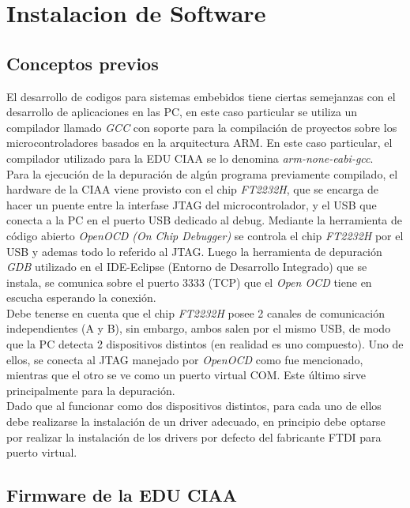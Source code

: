\documentclass[12pt,letterpaper]{article}
\begin{document}
\section{Instalacion de Software}

\subsection{Conceptos previos}
El desarrollo de codigos para sistemas embebidos tiene ciertas semejanzas con el desarrollo de aplicaciones en las PC, en este caso particular se utiliza un compilador llamado \textit{GCC} con soporte para la compilación de proyectos sobre los microcontroladores basados en la arquitectura ARM. En este caso particular, el compilador utilizado para la EDU CIAA se lo denomina \textit{arm-none-eabi-gcc}.
 \\
 
Para la ejecución de la depuración de algún programa previamente compilado, el hardware de la CIAA viene provisto con el chip \textit{FT2232H}, que se encarga de hacer un puente entre la interfase JTAG del microcontrolador, y el USB que conecta a la PC en el puerto USB dedicado al debug. Mediante la herramienta de código abierto \textit{OpenOCD (On Chip Debugger)} se controla el chip \textit{FT2232H} por el USB y ademas todo lo referido al JTAG. Luego la herramienta de depuración \textit{GDB} utilizado en el IDE-Eclipse (Entorno de Desarrollo Integrado) que se instala, se comunica sobre el puerto 3333 (TCP) que el \textit{Open OCD} tiene en escucha esperando la conexión\cite{descripcionopenocd}.
 \\
 
Debe tenerse en cuenta que el chip \textit{FT2232H} posee 2 canales de comunicación independientes (A y B), sin embargo, ambos salen por el mismo USB, de modo que la PC detecta 2 dispositivos distintos (en realidad es uno compuesto). Uno de ellos, se conecta al JTAG manejado por \textit{OpenOCD} como fue mencionado, mientras que el otro se ve como un puerto virtual COM. Este último sirve principalmente para la depuración.
 \\

Dado que al funcionar como dos dispositivos distintos, para cada uno de ellos debe realizarse la instalación de un driver adecuado, en principio debe optarse por realizar la instalación de los drivers por defecto del fabricante FTDI para puerto virtual. %

\subsection{Firmware de la EDU CIAA}
 
\end{document}
